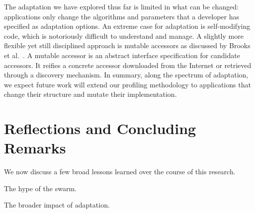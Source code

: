 \documentclass[thesis.tex]{subfiles}
\begin{document}
 The adaptation we have explored thus far is
limited in what can be changed: applications only change the algorithms and
parameters that a developer has specified as adaptation options. An extreme case
for adaptation is self-modifying code, which is notoriously difficult to
understand and manage. A slightly more flexible yet still disciplined approach
is mutable accessors as discussed by Brooks et al.~\cite{brooks2018component}. A
mutable accessor is an abstract interface specification for candidate
accessors. It reifies a concrete accessor downloaded from the Internet or
retrieved through a discovery mechanism. In summary, along the spectrum of
adaptation, we expect future work will extend our profiling methodology to
applications that change their structure and mutate their implementation.

\section{Reflections and Concluding Remarks}
\label{sec:conclusions}

We now discuss a few broad lessons learned over the course of this research.

The hype of the swarm.

The broader impact of adaptation.
\end{document}
